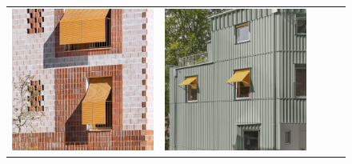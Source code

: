 \begin{figure}[H]
{\begin{tabular}{@{}ccccc@{}}
      \includegraphics[width=\linewidth]{Images/LoRAs/3D-effect/Training_images/6.jpg} &
      \includegraphics[width=\linewidth]{Images/LoRAs/3D-effect/Training_images/7.jpg} &

\end{tabular}}
\end{figure}
